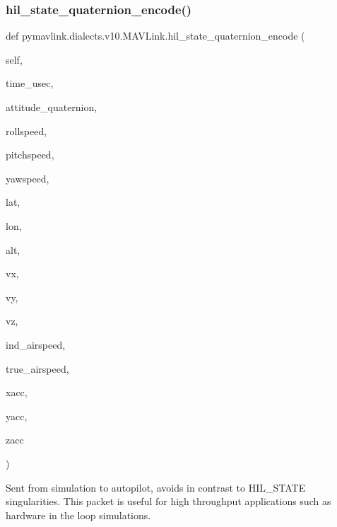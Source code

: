 \begin{DoxyVerb}
\begin{DoxyVerb}
\begin{DoxyVerb}
\begin{DoxyVerb}
\subsubsection{\texorpdfstring{hil\+\_\+state\+\_\+quaternion\+\_\+encode()}{hil\_state\_quaternion\_encode()}}
{\footnotesize\ttfamily def pymavlink.\+dialects.\+v10.\+M\+A\+V\+Link.\+hil\+\_\+state\+\_\+quaternion\+\_\+encode (\begin{DoxyParamCaption}\item[{}]{self,  }\item[{}]{time\+\_\+usec,  }\item[{}]{attitude\+\_\+quaternion,  }\item[{}]{rollspeed,  }\item[{}]{pitchspeed,  }\item[{}]{yawspeed,  }\item[{}]{lat,  }\item[{}]{lon,  }\item[{}]{alt,  }\item[{}]{vx,  }\item[{}]{vy,  }\item[{}]{vz,  }\item[{}]{ind\+\_\+airspeed,  }\item[{}]{true\+\_\+airspeed,  }\item[{}]{xacc,  }\item[{}]{yacc,  }\item[{}]{zacc }\end{DoxyParamCaption})}

\begin{DoxyVerb}Sent from simulation to autopilot, avoids in contrast to HIL_STATE
singularities. This packet is useful for high
throughput applications such as hardware in the loop
simulations.


\end{DoxyVerb}
\end{DoxyVerb}
\end{DoxyVerb}
\end{DoxyVerb}
\end{DoxyVerb}
